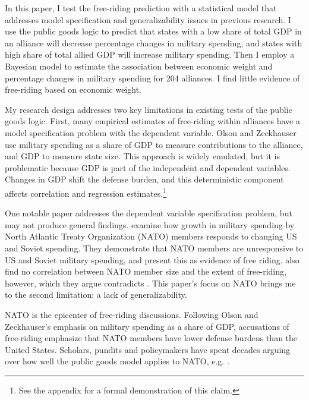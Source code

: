 \documentclass[12pt]{article}
\begin{document}
In this paper, I test the free-riding prediction with a statistical model that addresses model specification and generalizability issues in previous research. 
I use the public goods logic to predict that states with a low share of total GDP in an alliance will decrease percentage changes in military spending, and states with high share of total allied GDP will increase military spending.
Then I employ a Bayesian model to estimate the association between economic weight and percentage changes in military spending for 204 alliances. 
I find little evidence of free-riding based on economic weight. 


My research design addresses two key limitations in existing tests of the public goods logic.
First, many empirical estimates of free-riding within alliances have a model specification problem with the dependent variable.
Olson and Zeckhauser use military spending as a share of GDP to measure contributions to the alliance, and GDP to measure state size.
This approach is widely emulated, but it is problematic because GDP is part of the independent and dependent variables.
Changes in GDP shift the defense burden, and this deterministic component affects correlation and regression estimates.\footnote{See the appendix for a formal demonstration of this claim.}  


One notable paper addresses the dependent variable specification problem, but may not produce general findings. 
\citet{PluemperNeumayer2015} examine how growth in military spending by North Atlantic Treaty Organization (NATO) members responds to changing US and Soviet spending.
They demonstrate that NATO members are unresponsive to US and Soviet military spending, and present this as evidence of free riding.
\citet{PluemperNeumayer2015} also find no correlation between NATO member size and the extent of free-riding, however, which they argue contradicts \citet{OlsonZeckhauser1966}.
This paper's focus on NATO brings me to the second limitation: a lack of generalizability. 


NATO is the epicenter of free-riding discussions. 
Following Olson and Zeckhauser's emphasis on military spending as a share of GDP, accusations of free-riding emphasize that NATO members have lower defense burdens than the United States. 
Scholars, pundits and policymakers have spent decades arguing over how well the public goods model applies to NATO, e.g. \citep{Pryor1968, SandlerForbes1980, Palmer1990, HiltonVhu1991, Boyer1993, GatesTerasawa1992, SandlerHartley2001, Lanoszka2015, PluemperNeumayer2015, KimSandler2019}.
\end{document}
